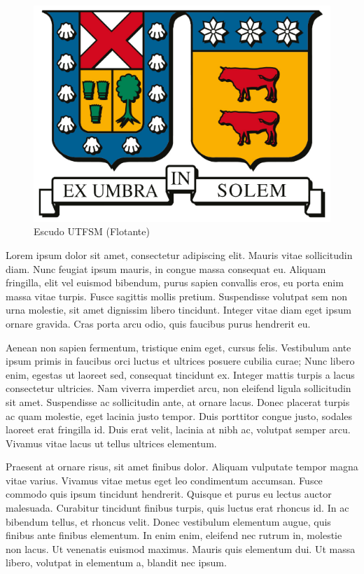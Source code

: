 \begin{figure}
    \vspace{-20pt}
    \begin{spacing}{1}
        \begin{center}
            \includegraphics[width=.35\columnwidth]{figures/escudo-utfsm.png}
            \vspace{-10pt}
            \caption{Escudo UTFSM (Flotante)}
            \label{fig:emblem-float}
        \end{center}
    \end{spacing}
    \vspace{-10pt}
\end{figure}

Lorem ipsum dolor sit amet, consectetur adipiscing elit. Mauris vitae sollicitudin diam. Nunc feugiat ipsum mauris, in congue massa consequat eu. Aliquam fringilla, elit vel euismod bibendum, purus sapien convallis eros, eu porta enim massa vitae turpis. Fusce sagittis mollis pretium. Suspendisse volutpat sem non urna molestie, sit amet dignissim libero tincidunt. Integer vitae diam eget ipsum ornare gravida. Cras porta arcu odio, quis faucibus purus hendrerit eu.

Aenean non sapien fermentum, tristique enim eget, cursus felis. Vestibulum ante ipsum primis in faucibus orci luctus et ultrices posuere cubilia curae; Nunc libero enim, egestas ut laoreet sed, consequat tincidunt ex. Integer mattis turpis a lacus consectetur ultricies. Nam viverra imperdiet arcu, non eleifend ligula sollicitudin sit amet. Suspendisse ac sollicitudin ante, at ornare lacus. Donec placerat turpis ac quam molestie, eget lacinia justo tempor. Duis porttitor congue justo, sodales laoreet erat fringilla id. Duis erat velit, lacinia at nibh ac, volutpat semper arcu. Vivamus vitae lacus ut tellus ultrices elementum.

Praesent at ornare risus, sit amet finibus dolor. Aliquam vulputate tempor magna vitae varius. Vivamus vitae metus eget leo condimentum accumsan. Fusce commodo quis ipsum tincidunt hendrerit. Quisque et purus eu lectus auctor malesuada. Curabitur tincidunt finibus turpis, quis luctus erat rhoncus id. In ac bibendum tellus, et rhoncus velit. Donec vestibulum elementum augue, quis finibus ante finibus elementum. In enim enim, eleifend nec rutrum in, molestie non lacus. Ut venenatis euismod maximus. Mauris quis elementum dui. Ut massa libero, volutpat in elementum a, blandit nec ipsum.

